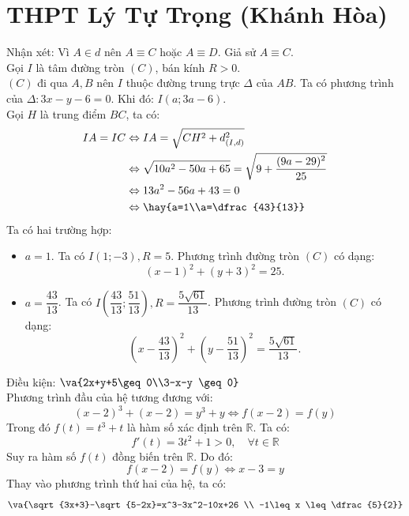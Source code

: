 \section{THPT Lý Tự Trọng (Khánh Hòa)}
\lgi
Nhận xét: Vì $A \in d$ nên $A \equiv C$ hoặc $A\equiv D$. Giả sử $A \equiv C$.\\
Gọi $I$ là tâm đường tròn $(C)$, bán kính $R>0$. \\
$(C)$ đi qua $A,B$ nên $I$ thuộc đường trung trực $\Delta$ của $AB$. Ta có phương trình của $\Delta: 3x-y-6=0.$ Khi đó: $I(a;3a-6).$\\
Gọi $H$ là trung điểm $BC$, ta có:
\begin{align*}
IA=IC & \Leftrightarrow IA = \sqrt{CH^2+d_{(I,d)}^2} \\
& \Leftrightarrow \sqrt{10a^2-50a+65} = \sqrt{9 + \dfrac{(9a-29)^2}{25}} \\
& \Leftrightarrow 13a^2-56a+43 = 0 \\
& \Leftrightarrow \hay{a=1\\a=\dfrac{43}{13}}
\end{align*}
Ta có hai trường hợp:
\begin{itemize}
\item $a=1$. Ta có $I(1;-3), R=5$. Phương trình đường tròn $(C)$ có dạng: $$(x-1)^2 +(y+3)^2=25.$$
\item $a=\dfrac{43}{13}$. Ta có $I \left(\dfrac{43}{13};\dfrac{51}{13}\right), R=\dfrac{5\sqrt{61}}{13}$. Phương trình đường tròn $(C)$ có dạng: $$\left(x-\dfrac{43}{13} \right)^2 + \left(y - \dfrac{51}{13}\right)^2 =\dfrac{5\sqrt{61}}{13}.$$
\end{itemize}
\lgi
Điều kiện: $\va{2x+y+5\geq 0\\3-x-y \geq 0}$\\
Phương trình đầu của hệ tương đương với:
$$(x-2)^3+(x-2)=y^3+y \Leftrightarrow f(x-2) = f(y)$$
Trong đó $f(t)=t^3+t$ là hàm số xác định trên $\mathbb{R}$. Ta có:
$$f'(t)=3t^2+1>0, \quad \forall t \in \mathbb{R}$$
Suy ra hàm số $f(t)$ đồng biến trên $\mathbb{R}$. Do đó:
$$f(x-2) = f(y) \Leftrightarrow x-3 =y$$
Thay vào phương trình thứ hai của hệ, ta có:
\begin{equation} \label{the9}
\va{\sqrt{3x+3}-\sqrt{5-2x}=x^3-3x^2-10x+26 \\ -1\leq x \leq \dfrac{5}{2}}
\end{equation}
